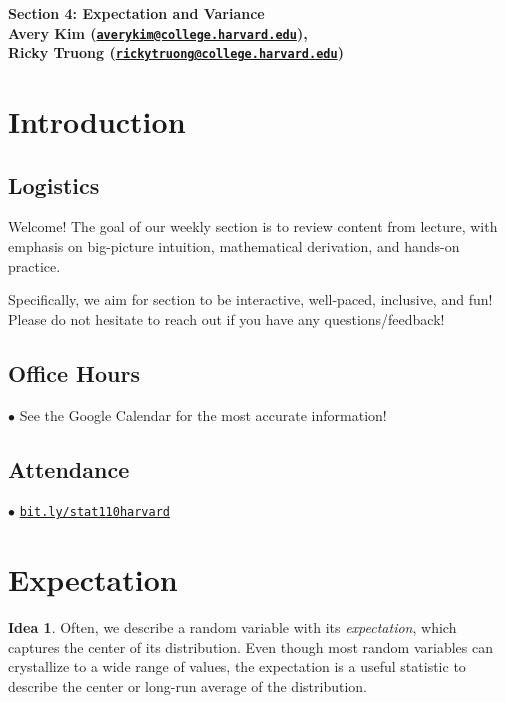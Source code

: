 \documentclass[12pt,oneside]{article}
\theoremstyle{definition}
\newtheorem*{idea}{Idea}
\theoremstyle{remark}
\begin{document}
\pagestyle{fancy}
\begin{center}
\bf \Large
Section 4: Expectation and Variance \\[0.5em]
\normalsize
Avery Kim (\href{mailto:averykim@college.harvard.edu}{\texttt{averykim@college.harvard.edu}}), \\[0.2em]
Ricky Truong (\href{mailto:rickytruong@college.harvard.edu}{\texttt{rickytruong@college.harvard.edu}})
\end{center}

\section{Introduction}

\subsection{Logistics}

Welcome! The goal of our weekly section is to review content from lecture, with emphasis on big-picture intuition, mathematical derivation, and hands-on practice.

Specifically, we aim for section to be interactive, well-paced, inclusive, and fun! Please do not hesitate to reach out if you have any questions/feedback!

\subsection{Office Hours}

$\bullet$ See the Google Calendar for the most accurate information!

\subsection{Attendance}

$\bullet$ \href{https://bit.ly/stat110harvard}{\texttt{bit.ly/stat110harvard}}

\section{Expectation}

\begin{idea}
Often, we describe a random variable with its \textit{expectation}, which captures the center of its distribution. Even though most random variables can crystallize to a wide range of values, the expectation is a useful statistic to describe the center or long-run average of the distribution.
\end{idea}
\end{document}

